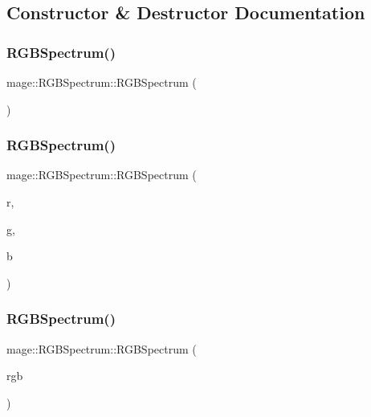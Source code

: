 \subsection{Constructor \& Destructor Documentation}
\hypertarget{structmage_1_1_r_g_b_spectrum_ac9ebcf270e9572fd0af180f50b7ceb10}{}\label{structmage_1_1_r_g_b_spectrum_ac9ebcf270e9572fd0af180f50b7ceb10} 
\subsubsection{\texorpdfstring{R\+G\+B\+Spectrum()}{RGBSpectrum()}\hspace{0.1cm}{\footnotesize\ttfamily [1/5]}}
{\footnotesize\ttfamily mage\+::\+R\+G\+B\+Spectrum\+::\+R\+G\+B\+Spectrum (\begin{DoxyParamCaption}{ }\end{DoxyParamCaption})}

\hypertarget{structmage_1_1_r_g_b_spectrum_aae798159a0ea02e95347918ef881b3aa}{}\label{structmage_1_1_r_g_b_spectrum_aae798159a0ea02e95347918ef881b3aa} 
\subsubsection{\texorpdfstring{R\+G\+B\+Spectrum()}{RGBSpectrum()}\hspace{0.1cm}{\footnotesize\ttfamily [2/5]}}
{\footnotesize\ttfamily mage\+::\+R\+G\+B\+Spectrum\+::\+R\+G\+B\+Spectrum (\begin{DoxyParamCaption}\item[{float}]{r,  }\item[{float}]{g,  }\item[{float}]{b }\end{DoxyParamCaption})}

\hypertarget{structmage_1_1_r_g_b_spectrum_a5cf405a5fbaa641a421df5767d2847b4}{}\label{structmage_1_1_r_g_b_spectrum_a5cf405a5fbaa641a421df5767d2847b4} 
\subsubsection{\texorpdfstring{R\+G\+B\+Spectrum()}{RGBSpectrum()}\hspace{0.1cm}{\footnotesize\ttfamily [3/5]}}
{\footnotesize\ttfamily mage\+::\+R\+G\+B\+Spectrum\+::\+R\+G\+B\+Spectrum (\begin{DoxyParamCaption}\item[{const \hyperlink{structmage_1_1_r_g_b_spectrum}{R\+G\+B\+Spectrum} \&}]{rgb }\end{DoxyParamCaption})}


